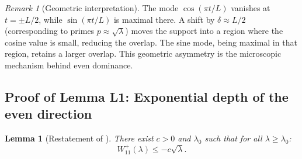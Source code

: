 \documentclass[12pt,a4paper]{article}
\newtheorem{lemma}[theorem]{Lemma}
\theoremstyle{definition}
\theoremstyle{remark}
\newtheorem{remark}[theorem]{Remark}
\begin{document}
\begin{remark}[Geometric interpretation]
The mode $\cos(\pi t/L)$ vanishes at $t = \pm L/2$, while $\sin(\pi t/L)$ is maximal there. A shift by $\delta \approx L/2$ (corresponding to primes $p \approx \sqrt{\lambda}$) moves the support into a region where the cosine value is small, reducing the overlap. The sine mode, being maximal in that region, retains a larger overlap. This geometric asymmetry is the microscopic mechanism behind even dominance.
\end{remark}

\subsection{Proof of Lemma L1: Exponential depth of the even direction}

\begin{lemma}[Restatement of ]
There exist $c > 0$ and $\lambda_0$ such that for all $\lambda \geq \lambda_0$:
\[
  W_{11}^+(\lambda) \leq -c\sqrt{\lambda}.
\]
\end{lemma}
\end{document}

